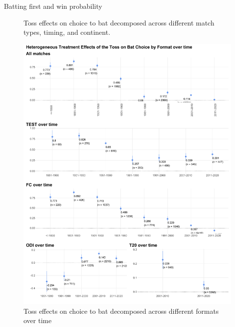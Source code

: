 \documentclass[11pt,  letterpaper]{article}
\begin{document}

\begin{table}
\scriptsize
\centering
\caption{Batting first and win probability}

\label{table:iv_table}
\end{table}


\begin{figure}
 \centering
 \caption{Toss effects on choice to bat decomposed across different match
 types, timing, and continent.}
 \label{fig:fs_het_TE1}
\end{figure}

\begin{figure}
 \centering
 \includegraphics[width=\textwidth,keepaspectratio]{output/first_stage_by_format_overtime.pdf}
 \caption{Toss effects on choice to bat decomposed across different formats
 over time}
 \label{fig:fs_het_TE2}
\end{figure}
\end{document}
